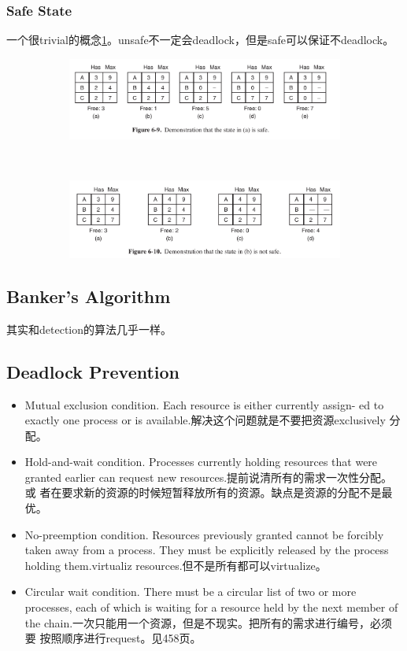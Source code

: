 \documentclass[a4paper]{article}
\begin{document}
\subsubsection{Safe State}
一个很trivial的概念\ref{safe}。unsafe不一定会deadlock，但是safe可以保证不deadlock。
\begin{figure}
  \begin{subfigure}[b]{0.4\linewidth}
  \centering
  \includegraphics{safe.png}
  \end{subfigure} \\
  \begin{subfigure}[b]{0.4\linewidth}
  \includegraphics{unsafe.png}
  \end{subfigure}
  \caption{}
  \label{safe}
\end{figure}

\subsection{Banker's Algorithm}
其实和detection的算法几乎一样。

\subsection{Deadlock Prevention}

\begin{itemize}
\item{Mutual exclusion condition. Each resource is either currently assign-
ed to exactly one process or is available.解决这个问题就是不要把资源exclusively
分配。}
\item{Hold-and-wait condition. Processes currently holding resources that
were granted earlier can request new resources.提前说清所有的需求一次性分配。或
者在要求新的资源的时候短暂释放所有的资源。缺点是资源的分配不是最优。}
\item{No-preemption condition. Resources previously granted cannot be
forcibly taken away from a process. They must be explicitly released
by the process holding them.virtualiz resources.但不是所有都可以virtualize。}
\item{Circular wait condition. There must be a circular list of two or more
processes, each of which is waiting for a resource held by the next
member of the chain.一次只能用一个资源，但是不现实。把所有的需求进行编号，必须要
按照顺序进行request。见458页。} 
\end{itemize}
\end{document}
